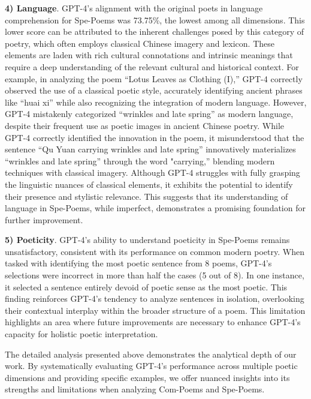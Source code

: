 \documentclass[11pt]{article}
\begin{document}
\textbf{4) Language}. GPT-4’s alignment with the original poets in language comprehension for Spe-Poems was 73.75\%, the lowest among all dimensions. This lower score can be attributed to the inherent challenges posed by this category of poetry, which often employs classical Chinese imagery and lexicon. These elements are laden with rich cultural connotations and intrinsic meanings that require a deep understanding of the relevant cultural and historical context. For example, in analyzing the poem ``Lotus Leaves as Clothing (I),'' GPT-4 correctly observed the use of a classical poetic style, accurately identifying ancient phrases like ``huai xi'' while also recognizing the integration of modern language. However, GPT-4 mistakenly categorized ``wrinkles and late spring'' as modern language, despite their frequent use as poetic images in ancient Chinese poetry. While GPT-4 correctly identified the innovation in the poem, it misunderstood that the sentence ``Qu Yuan carrying wrinkles and late spring'' innovatively materializes ``wrinkles and late spring'' through the word "carrying,'' blending modern techniques with classical imagery. Although GPT-4 struggles with fully grasping the linguistic nuances of classical elements, it exhibits the potential to identify their presence and stylistic relevance. This suggests that its understanding of language in Spe-Poems, while imperfect, demonstrates a promising foundation for further improvement.





\textbf{5) Poeticity}. GPT-4's ability to understand poeticity in Spe-Poems remains unsatisfactory, consistent with its performance on common modern poetry. When tasked with identifying the most poetic sentence from 8 poems, GPT-4's selections were incorrect in more than half the cases (5 out of 8). In one instance, it selected a sentence entirely devoid of poetic sense as the most poetic. This finding reinforces GPT-4's tendency to analyze sentences in isolation, overlooking their contextual interplay within the broader structure of a poem. This limitation highlights an area where future improvements are necessary to enhance GPT-4's capacity for holistic poetic interpretation.

The detailed analysis presented above demonstrates the analytical depth of our work. By systematically evaluating GPT-4's performance across multiple poetic dimensions and providing specific examples, we offer nuanced insights into its strengths and limitations when analyzing Com-Poems and Spe-Poems. 
\end{document}
